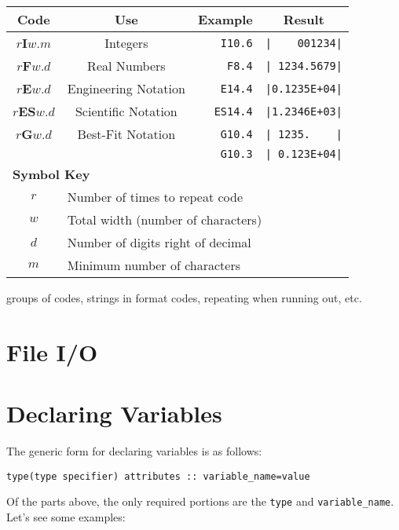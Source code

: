 \documentclass[11pt, letterpaper]{article}
\begin{document}
\begin{table}[!h]
  \begin{tabular}{|c|c|r|c|}
    \hline
    Code & Use & Example &  Result \\
    \hline
    $r$\textbf{I}$w.m$ & Integers             & \verb_I10.6_ & \verb_|    001234|_\\
    $r$\textbf{F}$w.d$ & Real Numbers         & \verb_F8.4_  & \verb_| 1234.5679|_\\
    $r$\textbf{E}$w.d$ & Engineering Notation & \verb_E14.4_ & \verb_|0.1235E+04|_\\
    $r$\textbf{ES}$w.d$& Scientific Notation  & \verb_ES14.4_& \verb_|1.2346E+03|_\\
    $r$\textbf{G}$w.d$ & Best-Fit Notation    & \verb_G10.4_ & \verb_| 1235.    |_\\
    &                      & \verb_G10.3_ & \verb_| 0.123E+04|_\\
    \hline
    \multicolumn{4}{|l|}{\textbf{Symbol Key}}\\
    \multicolumn{1}{|c}{$r$} & \multicolumn{3}{l|}{Number of times to repeat code}\\
    \multicolumn{1}{|c}{$w$} & \multicolumn{3}{l|}{Total width (number of characters)}\\
    \multicolumn{1}{|c}{$d$} & \multicolumn{3}{l|}{Number of digits right of decimal}\\ 
    \multicolumn{1}{|c}{$m$} & \multicolumn{3}{l|}{Minimum number of characters}\\
    \hline
    
  \end{tabular}
\end{table}

groups of codes, strings in format codes, repeating when running out, etc.


\section{File I/O}

\section{Declaring Variables}

The generic form for declaring variables is as follows:
\begin{verbatim}
type(type specifier) attributes :: variable_name=value
\end{verbatim}
Of the parts above, the only required portions are the \texttt{type} and
\texttt{variable\_name}.  Let's see some examples:
\end{document}
